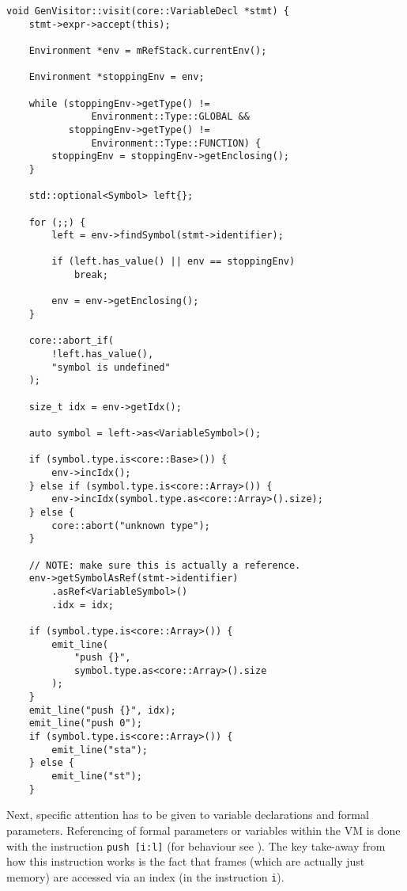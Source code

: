 \begin{lstlisting}[caption={The \texttt{visit(FormalParam *)}
method in the \texttt{GenVisitor} class
(ir\_gen/GenVisitor.cpp)}, label=lst:formalparam]
void GenVisitor::visit(core::VariableDecl *stmt) {
    stmt->expr->accept(this);

    Environment *env = mRefStack.currentEnv();

    Environment *stoppingEnv = env;

    while (stoppingEnv->getType() !=
               Environment::Type::GLOBAL &&
           stoppingEnv->getType() !=
               Environment::Type::FUNCTION) {
        stoppingEnv = stoppingEnv->getEnclosing();
    }

    std::optional<Symbol> left{};

    for (;;) {
        left = env->findSymbol(stmt->identifier);

        if (left.has_value() || env == stoppingEnv)
            break;

        env = env->getEnclosing();
    }

    core::abort_if(
        !left.has_value(),
        "symbol is undefined"
    );

    size_t idx = env->getIdx();

    auto symbol = left->as<VariableSymbol>();

    if (symbol.type.is<core::Base>()) {
        env->incIdx();
    } else if (symbol.type.is<core::Array>()) {
        env->incIdx(symbol.type.as<core::Array>().size);
    } else {
        core::abort("unknown type");
    }

    // NOTE: make sure this is actually a reference.
    env->getSymbolAsRef(stmt->identifier)
        .asRef<VariableSymbol>()
        .idx = idx;

    if (symbol.type.is<core::Array>()) {
        emit_line(
            "push {}",
            symbol.type.as<core::Array>().size
        );
    }
    emit_line("push {}", idx);
    emit_line("push 0");
    if (symbol.type.is<core::Array>()) {
        emit_line("sta");
    } else {
        emit_line("st");
    }
\end{lstlisting}

Next, specific attention has to be given to variable
declarations and formal parameters. Referencing of formal
parameters or variables within the VM is done with the
instruction \mbox{\texttt{push [i:l]}} (for behaviour see
). The key take-away from how this instruction
works is the fact that frames (which are actually just memory)
are accessed via an index (in the instruction \texttt{i}).

